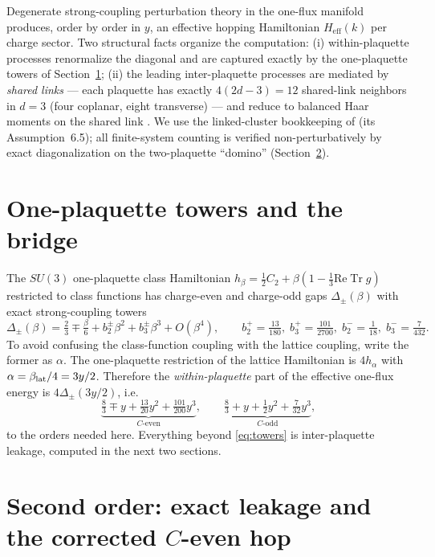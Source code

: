 \documentclass[11pt]{article}
\newcommand{\Tr}{\operatorname{Tr}}
\begin{document}
Degenerate strong-coupling perturbation theory in the one-flux manifold
produces, order by order in $y$, an effective hopping Hamiltonian
$H_{\mathrm{eff}}(k)$ per charge sector. Two structural facts organize the
computation: (i) within-plaquette processes renormalize the diagonal and are
captured exactly by the one-plaquette towers of Section~\ref{sec:towers};
(ii) the leading inter-plaquette processes are mediated by \emph{shared
links} --- each plaquette has exactly $4(2d-3)=12$ shared-link neighbors in
$d=3$ (four coplanar, eight transverse) --- and reduce to balanced Haar
moments on the shared link \cite{companion}. We use the linked-cluster
bookkeeping of \cite{companion} (its Assumption~6.5); all finite-system
counting is verified non-perturbatively by exact diagonalization on the
two-plaquette ``domino'' (Section~\ref{sec:leakage}).

\section{One-plaquette towers and the bridge}
\label{sec:towers}

The $SU(3)$ one-plaquette class Hamiltonian
$h_\beta=\tfrac12 C_2+\beta(1-\tfrac13\mathrm{Re}\Tr g)$ restricted to class
functions has charge-even and charge-odd gaps $\Delta_\pm(\beta)$ with exact
strong-coupling towers \cite{companion}
\begin{equation}
\Delta_\pm(\beta)=\tfrac23 \mp \tfrac{\beta}{6}
+ b_2^\pm\beta^2 + b_3^\pm\beta^3 + O(\beta^4),
\qquad
b_2^+=\tfrac{13}{180},\; b_3^+=\tfrac{101}{2700},\;
b_2^-=\tfrac{1}{18},\; b_3^-=\tfrac{7}{432}.
\end{equation}
To avoid confusing the class-function coupling with the lattice
coupling, write the former as $\alpha$.  The one-plaquette restriction of
the lattice Hamiltonian is $4h_\alpha$ with
$\alpha=\beta_{\rm lat}/4=3y/2$.  Therefore the \emph{within-plaquette}
part of the effective one-flux energy is $4\Delta_\pm(3y/2)$, i.e.
\begin{equation}
\underbrace{\tfrac83 \mp y + \tfrac{13}{20}y^2 + \tfrac{101}{200}y^3}_{C\text{-even}},
\qquad
\underbrace{\tfrac83 + y + \tfrac12 y^2 + \tfrac{7}{32}y^3}_{C\text{-odd}},
\label{eq:towers}
\end{equation}
to the orders needed here. Everything beyond \eqref{eq:towers} is
inter-plaquette leakage, computed in the next two sections.

\section{Second order: exact leakage and the corrected $C$-even hop}
\label{sec:leakage}
\end{document}
